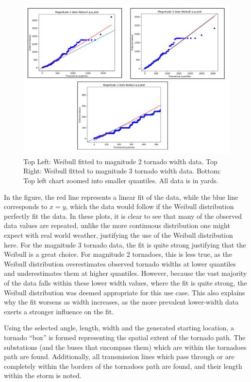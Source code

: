 \documentclass[12pt]{article}
\begin{document}
\begin{figure}[ht]
    \centering %
    \includegraphics[width=\textwidth]{WeibullDistribs.pdf}
    \caption[Fitted tornado width Q-Q plots]{Top Left: Weibull fitted to magnitude 2 tornado width data. Top Right: Weibull fitted to magnitude 3 tornado width data. Bottom: Top left chart zoomed into smaller quantiles. All data is in yards.}
    \label{fig:WeibullDistribs}
\end{figure}
In the figure, the red line represents a linear fit of the data, while the blue line corresponds to $x=y$, which the data would follow if the Weibull distribution perfectly fit the data. In these plots, it is clear to see that many of the observed data values are repeated, unlike the more continuous distribution one might expect with real world weather, justifying the use of the Weibull distribution here.  For the magnitude 3 tornado data, the fit is quite strong justifying that the Weibull is a great choice. For magnitude 2 tornadoes, this is less true, as the Weibull distribution overestimates observed tornado widths at lower quantiles and underestimates them at higher quantiles. However, because the vast majority of the data falls within these lower width values, where the fit is quite strong, the Weibull distribution was deemed appropriate for this use case. This also explains why the fit worsens as width increases, as the more prevalent lower-width data exerts a stronger influence on the fit. \par


Using the selected angle, length, width and the generated starting location, a tornado “box” is formed representing the spatial extent of the tornado path. The substations (and the buses that encompass them) which are within the tornadoes path are found. Additionally, all transmission lines which pass through or are completely within the borders of the tornadoes path are found, and their length within the storm is noted. \par
\end{document}
